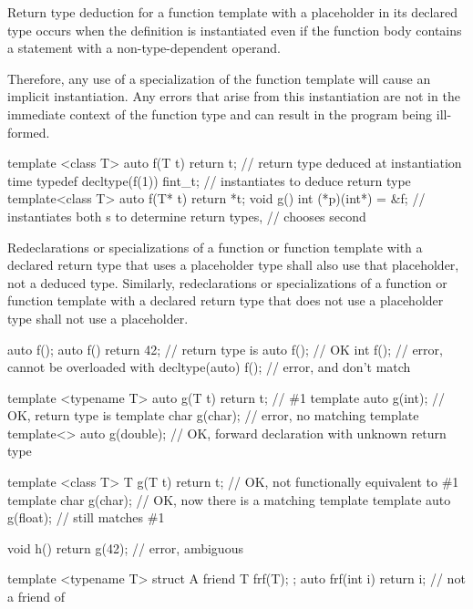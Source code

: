 \pnum
Return type deduction for a function template with a placeholder in its
declared type occurs when the definition is instantiated even if the function
body contains a  statement with a non-type-dependent operand.
\begin{note} Therefore, any use of a specialization of the function template will
cause an implicit instantiation. Any errors that arise from this instantiation
are not in the immediate context of the function type and can result in the
program being ill-formed. \end{note}
\begin{example}
\begin{codeblock}
template <class T> auto f(T t) { return t; }    // return type deduced at instantiation time
typedef decltype(f(1)) fint_t;                  // instantiates  to deduce return type
template<class T> auto f(T* t) { return *t; }
void g() { int (*p)(int*) = &f; }               // instantiates both s to determine return types,
                                                // chooses second
\end{codeblock}
\end{example}

\pnum
Redeclarations or specializations of a function or function template with a
declared return type that uses a placeholder type shall also use that
placeholder, not a deduced type.
Similarly,
redeclarations or specializations of a function or function template with a
declared return type that does not use a placeholder type
shall not use a placeholder.
\begin{example}
\begin{codeblock}
auto f();
auto f() { return 42; }                         // return type is 
auto f();                                       // OK
int f();                                        // error, cannot be overloaded with 
decltype(auto) f();                             // error,  and  don't match

template <typename T> auto g(T t) { return t; } // \#1
template auto g(int);                           // OK, return type is 
template char g(char);                          // error, no matching template
template<> auto g(double);                      // OK, forward declaration with unknown return type

template <class T> T g(T t) { return t; }       // OK, not functionally equivalent to \#1
template char g(char);                          // OK, now there is a matching template
template auto g(float);                         // still matches \#1

void h() { return g(42); }                      // error, ambiguous

template <typename T> struct A {
  friend T frf(T);
};
auto frf(int i) { return i; }                   // not a friend of 
\end{codeblock}
\end{example}

